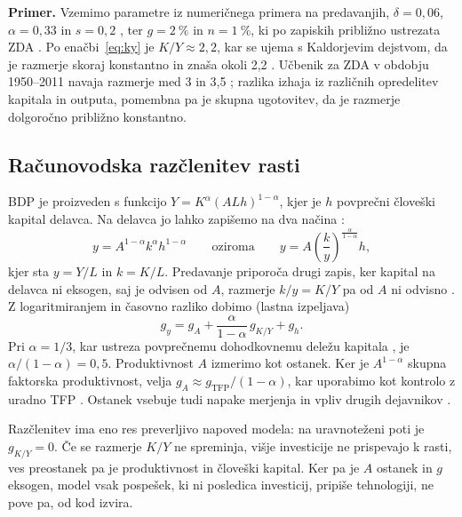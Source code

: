 \documentclass[12pt,a4paper]{article}
\begin{document}
\textbf{Primer.} Vzemimo parametre iz numeričnega primera na predavanjih, $\delta=0{,}06$, $\alpha=0{,}33$ in $s=0{,}2$ \parencite[pros.~40]{grobovsek2026}, ter $g=2~\%$ in $n=1~\%$, ki po zapiskih približno ustrezata ZDA \parencite[str.~18]{polanec_rast}. Po enačbi~\eqref{eq:ky} je $K/Y\approx2{,}2$, kar se ujema s Kaldorjevim dejstvom, da je razmerje skoraj konstantno in znaša okoli 2,2 \parencite[str.~9]{polanec_rast}. Učbenik za ZDA v obdobju 1950--2011 navaja razmerje med 3 in 3,5 \parencite[str.~61--62]{garin2021}; razlika izhaja iz različnih opredelitev kapitala in outputa, pomembna pa je skupna ugotovitev, da je razmerje dolgoročno približno konstantno.

\subsection{Računovodska razčlenitev rasti}\label{sec:racunovodstvo}
BDP je proizveden s funkcijo $Y=K^{\alpha}(ALh)^{1-\alpha}$, kjer je $h$ povprečni človeški kapital delavca. Na delavca jo lahko zapišemo na dva načina \parencite[pros.~65,~77]{grobovsek2026}:
\begin{equation}\label{eq:razclenitev}
y=A^{1-\alpha}k^{\alpha}h^{1-\alpha}
\qquad\text{oziroma}\qquad
y=A\left(\frac{k}{y}\right)^{\frac{\alpha}{1-\alpha}}h ,
\end{equation}
kjer sta $y=Y/L$ in $k=K/L$. Predavanje priporoča drugi zapis, ker kapital na delavca ni eksogen, saj je odvisen od $A$, razmerje $k/y=K/Y$ pa od $A$ ni odvisno \parencite[pros.~77]{grobovsek2026}. Z logaritmiranjem in časovno razliko dobimo (lastna izpeljava)
\begin{equation}\label{eq:rast}
g_y=g_A+\frac{\alpha}{1-\alpha}\,g_{K/Y}+g_h .
\end{equation}
Pri $\alpha=1/3$, kar ustreza povprečnemu dohodkovnemu deležu kapitala \parencites[pros.~78]{grobovsek2026}[str.~9,~23]{polanec_rast}, je $\alpha/(1-\alpha)=0{,}5$. Produktivnost $A$ izmerimo kot ostanek. Ker je $A^{1-\alpha}$ skupna faktorska produktivnost, velja $g_A\approx g_{\mathrm{TFP}}/(1-\alpha)$, kar uporabimo kot kontrolo z uradno TFP \parencites[pros.~16]{grobovsek2026}[str.~142]{garin2021}. Ostanek vsebuje tudi napake merjenja in vpliv drugih dejavnikov \parencites[str.~23--24]{polanec_rast}[str.~144--145]{garin2021}.

Razčlenitev ima eno res preverljivo napoved modela: na uravnoteženi poti je $g_{K/Y}=0$. Če se razmerje $K/Y$ ne spreminja, višje investicije ne prispevajo k rasti, ves preostanek pa je produktivnost in človeški kapital. Ker pa je $A$ ostanek in $g$ eksogen, model vsak pospešek, ki ni posledica investicij, pripiše tehnologiji, ne pove pa, od kod izvira.
\end{document}
